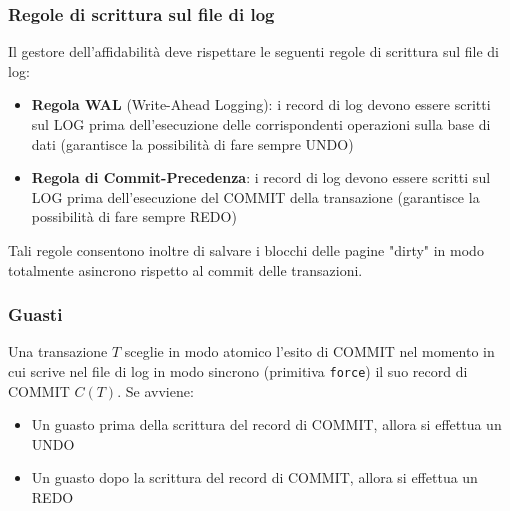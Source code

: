 \documentclass[a4paper]{article}
\begin{document}
\subsubsection{Regole di scrittura sul file di log}
Il gestore dell'affidabilità deve rispettare le seguenti regole di scrittura sul
file di log:
\begin{itemize}
  \item \textbf{Regola WAL} (Write-Ahead Logging): i record di log devono essere
    scritti sul LOG prima dell'esecuzione delle corrispondenti operazioni sulla base
    di dati (garantisce la possibilità di fare sempre UNDO)

  \item \textbf{Regola di Commit-Precedenza}: i record di log devono essere scritti
    sul LOG prima dell'esecuzione del COMMIT della transazione (garantisce la
    possibilità di fare sempre REDO)
\end{itemize}
Tali regole consentono inoltre di salvare i blocchi delle pagine "dirty" in modo
totalmente asincrono rispetto al commit delle transazioni.

\subsubsection{Guasti}
Una transazione \( T \) sceglie in modo atomico l'esito di COMMIT nel momento in
cui scrive nel file di log in modo sincrono (primitiva \texttt{force}) il suo
record di COMMIT \( C(T) \). Se avviene:
\begin{itemize}
  \item Un guasto prima della scrittura del record di COMMIT, allora si effettua un
    UNDO
  \item Un guasto dopo la scrittura del record di COMMIT, allora si effettua un REDO
\end{itemize}
\end{document}
